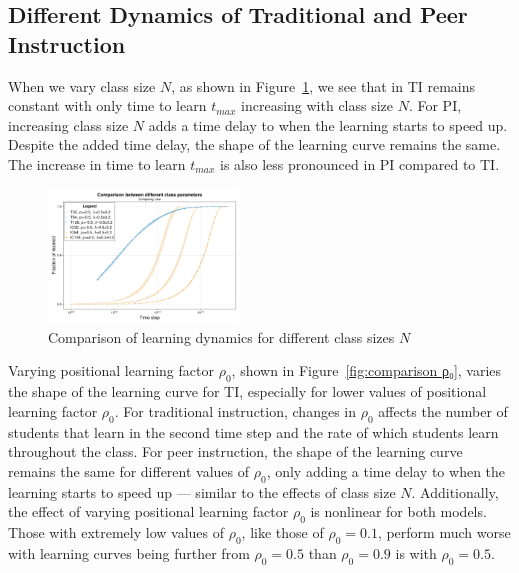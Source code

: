\documentclass[twocolumn,secnumarabic,amssymb, nobibnotes, aps, prd]{revtex4-2}
\begin{document}
    \subsection{Different Dynamics of Traditional and Peer Instruction}
        
        When we vary class size $N$, as shown in Figure~\ref{fig:comparison size}, we see that in TI remains constant with only time to learn $t_{max}$ increasing with class size $N$.
        For PI, increasing class size $N$ adds a time delay to when the learning starts to speed up. Despite the added time delay, the shape of the learning curve remains the same.
        The increase in time to learn $t_{max}$ is also less pronounced in PI compared to TI.

        \begin{figure}[htbp!]
            \centering
            \includegraphics[width=0.45\textwidth]{figures/2D-BPCAIH-analysis/comparison plots/size.png}
            \caption{Comparison of learning dynamics for different class sizes $N$}
            \label{fig:comparison size}
        \end{figure}

        Varying positional learning factor $\rho_0$, shown in Figure~\ref{fig:comparison ρ₀}, varies the shape of the learning curve for TI, especially for lower values of positional learning factor $\rho_0$.
        For traditional instruction, changes in $\rho_0$ affects the number of students that learn in the second time step and the rate of which students learn throughout the class.
        For peer instruction, the shape of the learning curve remains the same for different values of $\rho_0$, only adding a time delay to when the learning starts to speed up --- similar to the effects of class size $N$.
        Additionally, the effect of varying positional learning factor $\rho_0$ is nonlinear for both models. Those with extremely low values of $\rho_0$, like those of $\rho_0=0.1$, perform much worse with learning curves being further from $\rho_0=0.5$ than $\rho_0=0.9$ is with $\rho_0=0.5$.
\end{document}
